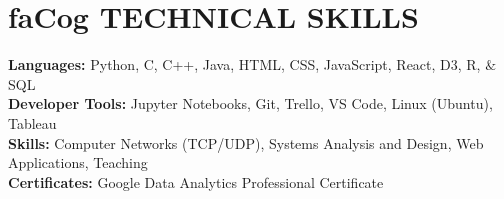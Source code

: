 \documentclass[a4paper,11pt]{article}
\newcommand{\seticon}[1]{\textcolor{Cerulean}{\csname #1\endcsname}}
\begin{document}
\section{\seticon{faCog} \textbf{TECHNICAL SKILLS}} %
\begin{itemize}[leftmargin=0.15in, label={}]
    \small{\item{
     \textbf{Languages:}{ Python, C, C++, Java, HTML, CSS, JavaScript, React, D3, R, $\&$ SQL} \\		   
    \textbf{Developer Tools:}{ Jupyter Notebooks, Git, Trello, VS Code, Linux (Ubuntu), Tableau}\\
    \textbf{Skills:}{ Computer Networks (TCP/UDP), Systems Analysis and Design, Web Applications, Teaching}\\ 
    \textbf{Certificates:}{ Google Data Analytics Professional Certificate}\\
    }}
 \end{itemize} \vspace{-13pt}
\end{document}
